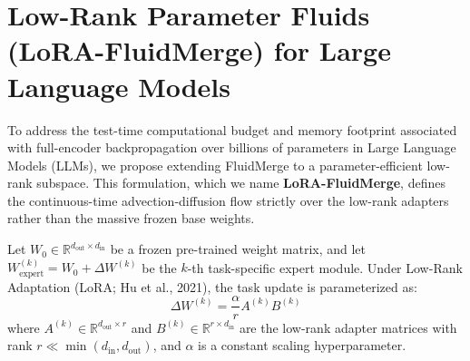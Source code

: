 \documentclass{article}
\theoremstyle{plain}
\theoremstyle{definition}
\theoremstyle{remark}
\begin{document}










\newpage
\appendix
\onecolumn

\section{Low-Rank Parameter Fluids (LoRA-FluidMerge) for Large Language Models}
\label{app:lora_fluidmerge}
To address the test-time computational budget and memory footprint associated with full-encoder backpropagation over billions of parameters in Large Language Models (LLMs), we propose extending FluidMerge to a parameter-efficient low-rank subspace. This formulation, which we name \textbf{LoRA-FluidMerge}, defines the continuous-time advection-diffusion flow strictly over the low-rank adapters rather than the massive frozen base weights.

Let $W_0 \in \mathbb{R}^{d_{\text{out}} \times d_{\text{in}}}$ be a frozen pre-trained weight matrix, and let $W_{\text{expert}}^{(k)} = W_0 + \Delta W^{(k)}$ be the $k$-th task-specific expert module. Under Low-Rank Adaptation (LoRA; Hu et al., 2021), the task update is parameterized as:
\begin{equation}
\Delta W^{(k)} = \frac{\alpha}{r} A^{(k)} B^{(k)}
\end{equation}
where $A^{(k)} \in \mathbb{R}^{d_{\text{out}} \times r}$ and $B^{(k)} \in \mathbb{R}^{r \times d_{\text{in}}}$ are the low-rank adapter matrices with rank $r \ll \min(d_{\text{in}}, d_{\text{out}})$, and $\alpha$ is a constant scaling hyperparameter.
\end{document}
